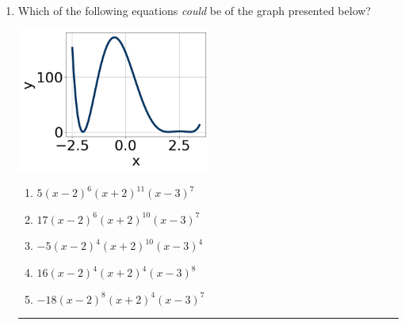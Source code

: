 \documentclass[14pt]{extbook}
\newcommand{\litem}[1]{\item#1\hspace*{-1cm}\rule{\textwidth}{0.4pt}}
\begin{document}
\begin{enumerate}
{\begin{enumerate}[label=\Alph*.]
\end{enumerate} }
\litem{
Which of the following equations \textit{could} be of the graph presented below?
\begin{center}
    \includegraphics[width=0.5\textwidth]{../Figures/polyGraphToFunctionA.png}
\end{center}
\begin{enumerate}[label=\Alph*.]
\item \( 5(x - 2)^{6} (x + 2)^{11} (x - 3)^{7} \)
\item \( 17(x - 2)^{6} (x + 2)^{10} (x - 3)^{7} \)
\item \( -5(x - 2)^{4} (x + 2)^{10} (x - 3)^{4} \)
\item \( 16(x - 2)^{4} (x + 2)^{4} (x - 3)^{8} \)
\item \( -18(x - 2)^{8} (x + 2)^{4} (x - 3)^{7} \)


\end{enumerate}}
\end{enumerate}
\end{document}
